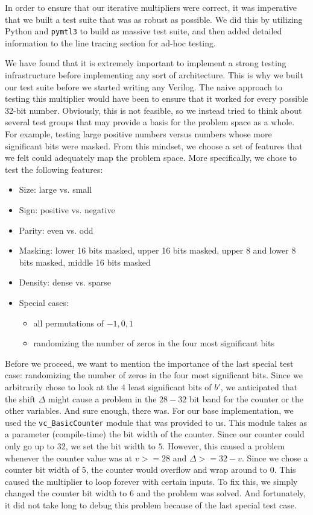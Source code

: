 \documentclass[10pt]{article}
\begin{document}
	In order to ensure that our iterative multipliers were correct, it was imperative that we built a test suite that was as robust as possible. We did this by utilizing Python and \texttt{pymtl3} to build as massive test suite, and then added detailed information to the line tracing section for ad-hoc testing.

	We have found that it is extremely important to implement a strong testing infrastructure before implementing any sort of architecture. This is why we built our test suite before we started writing any Verilog. The naive approach to testing this multiplier would have been to ensure that it worked for every possible 32-bit number. Obviously, this is not feasible, so we instead tried to think about several test groups that may provide a basis for the problem space as a whole. For example, testing large positive numbers versus numbers whose more significant bits were masked. From this mindset, we choose a set of features that we felt could adequately map the problem space. More specifically, we chose to test the following features:
	\begin{itemize}
		\item Size: large vs. small
		\item Sign: positive vs. negative
		\item Parity: even vs. odd
		\item Masking: lower 16 bits masked, upper 16 bits masked, upper 8 and lower 8 bits masked, middle 16 bits masked
		\item Density: dense vs. sparse
		\item Special cases:
		\begin{itemize}
			\item all permutations of $-1,0,1$
			\item randomizing the number of zeros in the four most significant bits
		\end{itemize}
	\end{itemize}

	Before we proceed, we want to mention the importance of the last special test case: randomizing the number of zeros in the four most significant bits. Since we arbitrarily chose to look at the 4 least significant bits of $b'$, we anticipated that the shift $\Delta$ might cause a problem in the $28-32$ bit band for the counter or the other variables. And sure enough, there was. For our base implementation, we used the \texttt{vc\_BasicCounter} module that was provided to us. This module takes as a parameter (compile-time) the bit width of the counter. Since our counter could only go up to $32$, we set the bit width to $5$. However, this caused a problem whenever the counter value was at $v>=28$ and $\Delta>=32-v$. Since we chose a counter bit width of $5$, the counter would overflow and wrap around to $0$. This caused the multiplier to loop forever with certain inputs. To fix this, we simply changed the counter bit width to $6$ and the problem was solved. And fortunately, it did not take long to debug this problem because of the last special test case.
\end{document}
